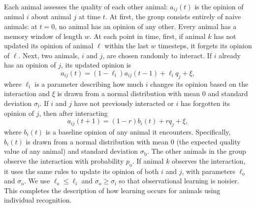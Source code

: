 Each animal assesses the quality of each other animal: $a_{ij}(t)$ is the opinion of animal $i$ about animal $j$ at time $t$.  At first, the group consists entirely of naive animals: at $t=0$, no animal has an opinion of any other. Every animal has a memory window of length $w$. At each point in time, first, if animal $k$ has not updated its opinion of animal $\ell$ within the last $w$ timesteps, it forgets its opinion of $\ell$. Next, two animals, $i$ and $j$, are chosen randomly to interact. If $i$ already has an opinion of $j$, its updated opinion is 
\begin{equation*}
a_{ij}(t)=(1-\ell_\text{i})a_{ij}(t-1)+\ell_\text{i} q_j+\xi,
\end{equation*}
where $\ell_\text{i}$ is a parameter describing how much $i$ changes its opinion based on the interaction and $\xi$ is drawn from a normal distribution with mean $0$ and standard deviation $\sigma_\text{i}$. If $i$ and $j$ have not previously interacted or $i$ has forgotten its opinion of $j$, then after interacting 
\begin{equation*}
a_{ij}(t+1)=(1-r)b_{i}(t)+rq_j+\xi,
\end{equation*}
where $b_i(t)$ is a baseline opinion of any animal it encounters. Specifically, $b_i(t)$ is drawn from a normal distribution with mean $0$ (the expected quality value of any animal) and standard deviation $\sigma_\text{b}$. The other animals in the group observe the interaction with probability $p_\text{o}$. If animal $k$ observes the interaction, it uses the same rules to update its opinion of both $i$ and $j$, with parameters $\ell_\text{o}$ and $\sigma_\text{o}$. We use $\ell_\text{o}\leq\ell_\text{i}$ and $\sigma_\text{o}\geq\sigma_\text{i}$ so that observational learning is noisier. This completes the description of how learning occurs for animals using individual recognition. 

